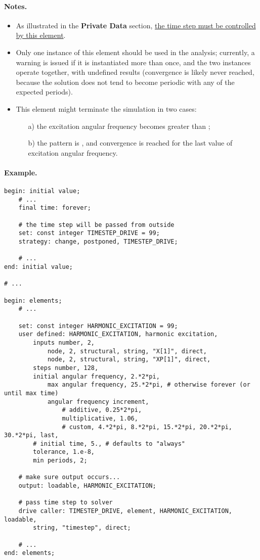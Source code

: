 \paragraph{Notes.}
\begin{itemize}
\item As illustrated in the \textbf{Private Data}  section, \underline{the time step must be controlled by this element}.

\item Only one instance of this element should be used in the analysis; currently, a warning is issued if it is instantiated more than once, and the two instances operate together, with undefined results (convergence is likely never reached, because the solution does not tend to become periodic with any of the expected periods).

\item This element might terminate the simulation in two cases:
\begin{itemize}
\item[a)] the excitation angular frequency becomes greater than ;
\item[b)] the  pattern is , and convergence is reached for the last value of excitation angular frequency.
\end{itemize}
\end{itemize}

\paragraph{Example.}
\begin{verbatim}
begin: initial value;
    # ...
    final time: forever;

    # the time step will be passed from outside
    set: const integer TIMESTEP_DRIVE = 99;
    strategy: change, postponed, TIMESTEP_DRIVE;

    # ...
end: initial value;

# ...

begin: elements;
    # ...

    set: const integer HARMONIC_EXCITATION = 99;
    user defined: HARMONIC_EXCITATION, harmonic excitation,
        inputs number, 2,
            node, 2, structural, string, "X[1]", direct,
            node, 2, structural, string, "XP[1]", direct,
        steps number, 128,
        initial angular frequency, 2.*2*pi,
            max angular frequency, 25.*2*pi, # otherwise forever (or until max time)
            angular frequency increment,
                # additive, 0.25*2*pi,
                multiplicative, 1.06,
                # custom, 4.*2*pi, 8.*2*pi, 15.*2*pi, 20.*2*pi, 30.*2*pi, last,
        # initial time, 5., # defaults to "always"
        tolerance, 1.e-8,
        min periods, 2;

    # make sure output occurs...
    output: loadable, HARMONIC_EXCITATION;

    # pass time step to solver
    drive caller: TIMESTEP_DRIVE, element, HARMONIC_EXCITATION, loadable,
        string, "timestep", direct;

    # ...
end: elements;
\end{verbatim}

